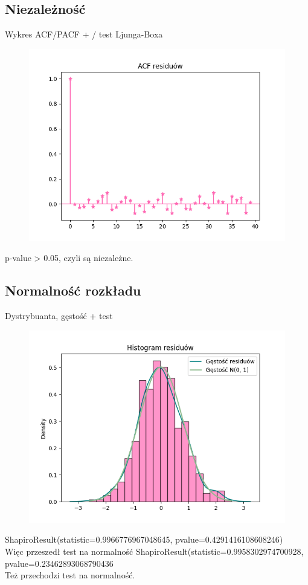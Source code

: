 \documentclass[12pt]{article}
\begin{document}
\subsection{Niezależność}
Wykres ACF/PACF + / test Ljunga-Boxa \\
\begin{figure}[!htbp]
    \centering
    \includegraphics[scale=0.70]{resid_acf.png}
    \label{fig:enter-label}
\end{figure}
p-value > 0.05, czyli są niezależne.

\subsection{Normalność rozkładu}
Dystrybuanta, gęstość + test
\begin{figure}[!htbp]
    \centering
    \includegraphics[scale=0.70]{norm.png}
    \label{fig:enter-label}
\end{figure}
ShapiroResult(statistic=0.9966776967048645, pvalue=0.4291416108608246) \\
Więc przeszedł test na normalność
ShapiroResult(statistic=0.9958302974700928, pvalue=0.23462893068790436 \\
Też przechodzi test na normalność.
\end{document}
